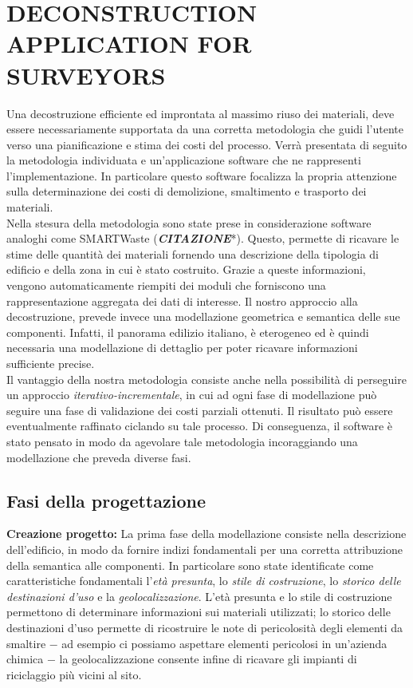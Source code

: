 \section{\uppercase{Deconstruction Application for surveyors}}
\label{sec:application}

\noindent Una decostruzione efficiente ed improntata al massimo riuso dei materiali, deve essere necessariamente supportata da una corretta metodologia che guidi l'utente verso una pianificazione e stima dei costi del processo. Verr\`a presentata di seguito la metodologia individuata e un'applicazione software che ne rappresenti l'implementazione. In particolare questo software focalizza la propria attenzione sulla determinazione dei costi di demolizione, smaltimento e trasporto dei materiali.\\

\noindent Nella stesura della metodologia sono state prese in considerazione software analoghi come SMARTWaste (\textbf{\textit{CITAZIONE}}*). Questo, permette di ricavare le stime delle quantit\`a dei materiali fornendo una descrizione della tipologia di edificio e della zona in cui \`e stato costruito. Grazie a queste informazioni, vengono automaticamente riempiti dei moduli che forniscono una rappresentazione aggregata dei dati di interesse. Il nostro approccio alla decostruzione, prevede invece una modellazione geometrica e semantica delle sue componenti. Infatti, il panorama edilizio italiano, \`e eterogeneo ed \`e quindi necessaria una modellazione di dettaglio per poter ricavare informazioni sufficiente precise.\\

\noindent Il vantaggio della nostra metodologia consiste anche nella possibilit\`a di perseguire un approccio \textit{iterativo-incrementale}, in cui ad ogni fase di modellazione pu\`o seguire una fase di validazione dei costi parziali ottenuti. Il risultato pu\`o essere eventualmente raffinato ciclando su tale processo. Di conseguenza, il software \`e stato pensato in modo da agevolare tale metodologia incoraggiando una modellazione che preveda diverse fasi.\\

\subsection{Fasi della progettazione}

\noindent \textbf{Creazione progetto:} La prima fase della modellazione consiste nella descrizione dell'edificio, in modo da fornire indizi fondamentali per una corretta attribuzione della semantica alle componenti. In particolare sono state identificate come caratteristiche fondamentali l'\textit{et\`a presunta}, lo \textit{stile di costruzione}, lo \textit{storico delle destinazioni d'uso} e la \textit{geolocalizzazione}. L'et\`a presunta e lo stile di costruzione permettono di determinare informazioni sui materiali utilizzati; lo storico delle destinazioni d'uso permette di ricostruire le note di pericolosit\`a degli elementi da smaltire $-$ ad esempio ci possiamo aspettare elementi pericolosi in un'azienda chimica $-$ la geolocalizzazione consente infine di ricavare gli impianti di riciclaggio pi\`u vicini al sito.\\

